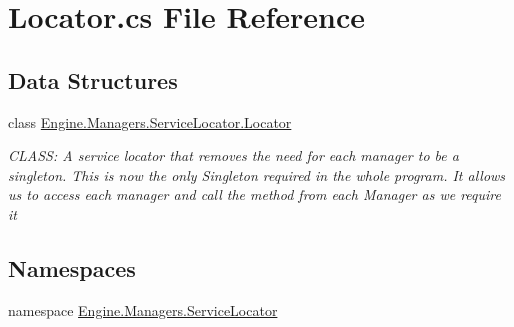\hypertarget{a00188}{}\section{Locator.\+cs File Reference}
\label{a00188}
\subsection*{Data Structures}
\begin{DoxyCompactItemize}
\item 
class \hyperlink{a00542}{Engine.\+Managers.\+Service\+Locator.\+Locator}
\begin{DoxyCompactList}\small\item\em C\+L\+A\+SS\+: A service locator that removes the need for each manager to be a singleton. This is now the only Singleton required in the whole program. It allows us to access each manager and call the method from each Manager as we require it \end{DoxyCompactList}\end{DoxyCompactItemize}
\subsection*{Namespaces}
\begin{DoxyCompactItemize}
\item 
namespace \hyperlink{a00274}{Engine.\+Managers.\+Service\+Locator}
\end{DoxyCompactItemize}
